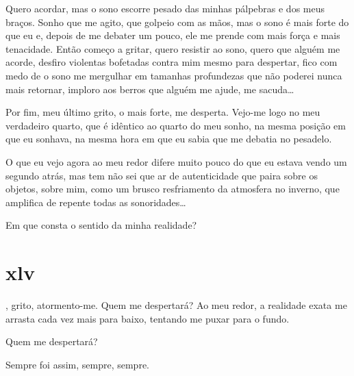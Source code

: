 Quero acordar, mas o sono escorre pesado das minhas pálpebras e dos meus
braços. Sonho que me agito, que golpeio com as mãos, mas o sono é mais forte
do que eu e, depois de me debater um pouco, ele me prende com mais força e
mais tenacidade. Então começo a gritar, quero resistir ao sono, quero que
alguém me acorde, desfiro violentas bofetadas contra mim mesmo para
despertar, fico com medo de o sono me mergulhar em tamanhas profundezas que
não poderei nunca mais retornar, imploro aos berros que alguém me ajude, me
sacuda\ldots{}

Por fim, meu último grito, o mais forte, me desperta. Vejo-me logo no meu
verdadeiro quarto, que é idêntico ao quarto do meu sonho, na mesma posição em
que eu sonhava, na mesma hora em que eu sabia que me debatia no pesadelo.

O que eu vejo agora ao meu redor difere muito pouco do que eu estava vendo um
segundo atrás, mas tem não sei que ar de autenticidade que paira sobre os
objetos, sobre mim, como um brusco resfriamento da atmosfera no inverno, que
amplifica de repente todas as sonoridades\ldots{}

Em que consta o sentido da minha realidade?


\section{xlv} 

, grito, atormento-me. Quem me despertará?
Ao meu redor, a realidade exata me arrasta cada vez mais para baixo, tentando
me puxar para o fundo.

Quem me despertará?

Sempre foi assim, sempre, sempre.
